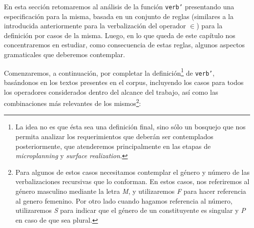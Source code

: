 En esta sección retomaremos al análisis de la función \texttt{verb'} presentando una especificación para la misma, basada en un conjunto de reglas (similares a la introducida anteriormente para la verbalización del operador $\in$) para la definición por casos de la misma. Luego, en lo que queda de este capítulo nos concentraremos en estudiar, como consecuencia de estas reglas, algunos aspectos gramaticales que deberemos contemplar.

Comenzaremos, a continuación, por completar la definición\footnote{La idea no es que ésta sea una definición final, sino sólo un bosquejo que nos permita analizar los requerimientos que deberán ser contemplados posteriormente, que atenderemos principalmente en las etapas de \textit{microplanning} y \textit{surface realization}.} de \texttt{verb'}, basándonos en los textos presentes en el corpus, incluyendo los casos para todos los operadores considerados dentro del alcance del trabajo, así como las combinaciones más relevantes de los mismos\footnote{Para algunos de estos casos necesitamos contemplar el género y número de las verbalizaciones recursivas que lo conforman. En estos casos, nos referiremos al género masculino mediante la letra \emph{M}, y utilizaremos \emph{F} para hacer referencia al genero femenino. Por otro lado cuando hagamos referencia al número, utilizaremos \emph{S} para indicar que el género de un constituyente es singular y \emph{P} en caso de que sea plural.}:

